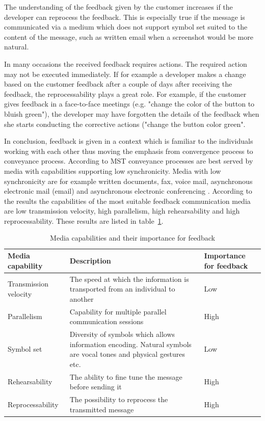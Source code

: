 \documentclass[english,12pt,a4paper,pdftex]{article}
\begin{document}
The understanding of the feedback given by the customer increases if the developer can reprocess the feedback. This is especially true if the message is communicated via a medium which does not support symbol set suited to the content of the message, such as written email when a screenshot would be more natural.

In many occasions the received feedback requires actions. The required action may not be executed immediately. If for example a developer makes a change based on the customer feedback after a couple of days after receiving the feedback, the reprocessability plays a great role. For example, if the customer gives feedback in a face-to-face meetings (e.g. "change the color of the button to bluish green"), the developer may have forgotten the details of the feedback when she starts conducting the corrective actions ("change the button color green".

In conclusion, feedback is given in a context which is familiar to the individuals working with each other thus moving the emphasis from convergence process to conveyance process. According to \ac{MST} conveyance processes are best served by media with capabilities supporting low synchronicity. Media with low synchronicity are for example written documents, fax, voice mail, asynchronous electronic mail (email) and asynchronous electronic conferencing \citep{dennis1999}. According to the results the capabilities of the most suitable feedback communication media are low transmission velocity, high parallelism, high rehearsability and high reprocessability. These results are listed in table~\ref{table:mst_feedback}.

\begin{table}[!h]
\renewcommand{\arraystretch}{1.3}
\caption{Media capabilities and their importance for feedback}
\label{table:mst_feedback}
\centering
\begin{tabular}{|p{4cm}|p{7cm}|p{3cm}|}
\hline
\textbf{Media capability} & \textbf{Description} & \textbf{Importance for feedback}\\
\hline
Transmission velocity & The speed at which the information is transported from an individual to another & Low \\
\hline
Parallelism & Capability for multiple parallel communication sessions & High \\
\hline
Symbol set & Diversity of symbols which allows information encoding. Natural symbols are vocal tones and physical gestures etc. & Low \\
\hline
Rehearsability & The ability to fine tune the message before sending it & High \\
\hline
Reprocessability & The possibility to reprocess the transmitted message & High \\
\hline
\end{tabular}
\end{table}
\end{document}
